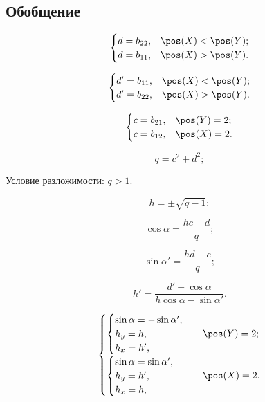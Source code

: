 \subsection{Обобщение}

$$\begin{cases}
	d = b_{22}, & \pos(X) < \pos(Y); \\
	d = b_{11}, & \pos(X) > \pos(Y). \\
\end{cases}$$

$$\begin{cases}
	d' = b_{11}, & \pos(X) < \pos(Y); \\
	d' = b_{22}, & \pos(X) > \pos(Y). \\
\end{cases}$$

$$\begin{cases}
	c = b_{21}, & \pos(Y) = 2; \\
	c = b_{12}, & \pos(X) = 2. \\
\end{cases}$$

$$q = c^2 + d^2;$$

Условие разложимости: $q > 1$.

$$h = \pm \sqrt{q - 1};$$

$$\cos\alpha = \frac{h c + d}{q};$$

$$\sin\alpha' = \frac{h d - c}{q};$$

$$h' = \frac{d' - \cos\alpha}{h \cos\alpha - \sin\alpha'}.$$

$$\begin{cases}
	\begin{cases}
		\sin\alpha = -\sin\alpha',\\
		h_y = h,\\
		h_x = h',\\
	\end{cases} & \pos(Y) = 2; \\
	\begin{cases}
		\sin\alpha = \sin\alpha',\\
		h_y = h',\\
		h_x = h,\\
	\end{cases} & \pos(X) = 2. \\
\end{cases}$$